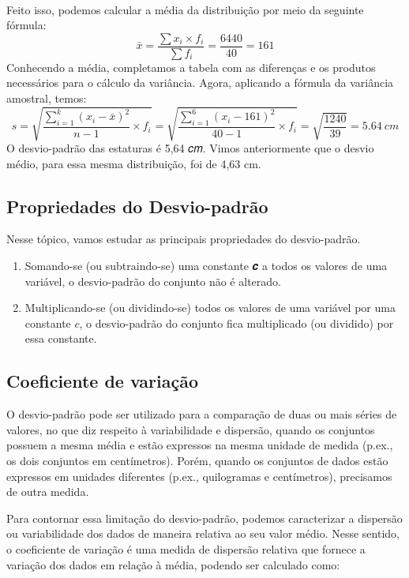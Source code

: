 \begin{example}
\begin{table}[H]
\begin{tabular}{lcccccc}
\end{tabular}
\caption{}
\label{tab:desv_padr}
\end{table}
Feito isso, podemos calcular a média da distribuição por meio da seguinte fórmula:
\[
    \bar{x}=\frac{\sum x_i\times f_i}{\sum f_i}=\frac{6440}{40}=161
\]
Conhecendo a média, completamos a tabela com as diferenças e os produtos necessários para o cálculo da variância. Agora, aplicando a fórmula da variância amostral, temos:
\[
    s=\sqrt{\frac{\sum_{i=1}^{k}(x_i-\bar{x})^2}{n-1}\times f_i}
    = \sqrt{\frac{\sum_{i=1}^{6}(x_i-161)^2}{40-1}\times f_i}
    =\sqrt{\frac{1240}{39}}=\SI{5,64}{cm}
\]
O desvio-padrão das estaturas é 5,64 𝑐𝑚. Vimos anteriormente que o desvio médio, para essa mesma distribuição, foi de 4,63 cm.
\end{example}

\subsection{Propriedades do Desvio-padrão}

Nesse tópico, vamos estudar as principais propriedades do desvio-padrão.

\begin{enumerate}
    \item Somando-se (ou subtraindo-se) uma constante 𝒄 a todos os valores de uma variável, o desvio-padrão do conjunto não é alterado.
    \item Multiplicando-se (ou dividindo-se) todos os valores de uma variável por uma constante $c$, o desvio-padrão do conjunto fica multiplicado (ou dividido) por essa constante.
\end{enumerate}

\subsection{Coeficiente de variação}

O desvio-padrão pode ser utilizado para a comparação de duas ou mais séries de valores, no que diz respeito à variabilidade e dispersão, quando os conjuntos possuem a mesma média e estão expressos na mesma unidade de medida (p.ex., os dois conjuntos em centímetros). Porém, quando os conjuntos de dados estão expressos em unidades diferentes (p.ex., quilogramas e centímetros), precisamos de outra medida.

Para contornar essa limitação do desvio-padrão, podemos caracterizar a dispersão ou variabilidade dos dados de maneira relativa ao seu valor médio. Nesse sentido, o coeficiente de variação é uma medida de    dispersão relativa que fornece a variação dos dados em relação à média, podendo ser calculado como:

